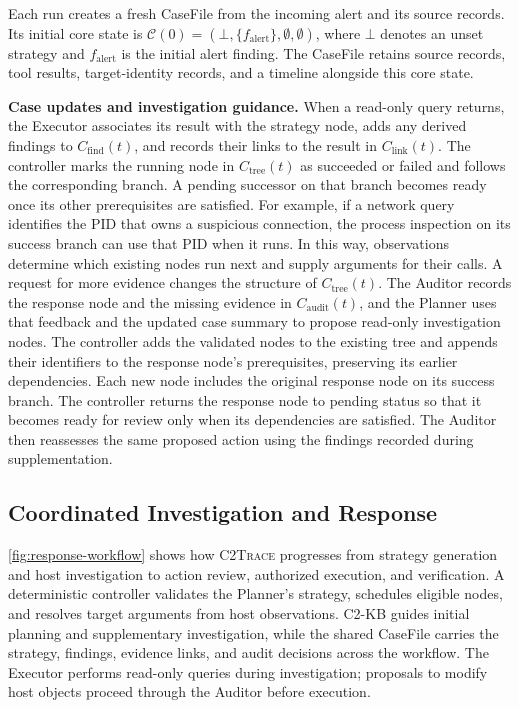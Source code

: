 \documentclass[pdflatex,sn-basic]{sn-jnl}
\newcommand{\system}{\textsc{C2Trace}\xspace}
\begin{document}
Each run creates a fresh CaseFile from the incoming alert and its source records. Its initial core state is $\mathcal{C}(0)=(\bot,\{f_{\mathrm{alert}}\},\emptyset,\emptyset)$, where $\bot$ denotes an unset strategy and $f_{\mathrm{alert}}$ is the initial alert finding. The CaseFile retains source records, tool results, target-identity records, and a timeline alongside this core state.

\noindent\textbf{Case updates and investigation guidance.} When a read-only query returns, the Executor associates its result with the strategy node, adds any derived findings to $C_{\mathrm{find}}(t)$, and records their links to the result in $C_{\mathrm{link}}(t)$. The controller marks the running node in $C_{\mathrm{tree}}(t)$ as succeeded or failed and follows the corresponding branch. A pending successor on that branch becomes ready once its other prerequisites are satisfied. For example, if a network query identifies the PID that owns a suspicious connection, the process inspection on its success branch can use that PID when it runs. In this way, observations determine which existing nodes run next and supply arguments for their calls. A request for more evidence changes the structure of $C_{\mathrm{tree}}(t)$. The Auditor records the response node and the missing evidence in $C_{\mathrm{audit}}(t)$, and the Planner uses that feedback and the updated case summary to propose read-only investigation nodes. The controller adds the validated nodes to the existing tree and appends their identifiers to the response node's prerequisites, preserving its earlier dependencies. Each new node includes the original response node on its success branch. The controller returns the response node to pending status so that it becomes ready for review only when its dependencies are satisfied. The Auditor then reassesses the same proposed action using the findings recorded during supplementation.

\subsection{Coordinated Investigation and Response}
\label{sec:coordinated-workflow}

\autoref{fig:response-workflow} shows how \system progresses from strategy generation and host investigation to action review, authorized execution, and verification. A deterministic controller validates the Planner's strategy, schedules eligible nodes, and resolves target arguments from host observations. C2-KB guides initial planning and supplementary investigation, while the shared CaseFile carries the strategy, findings, evidence links, and audit decisions across the workflow. The Executor performs read-only queries during investigation; proposals to modify host objects proceed through the Auditor before execution.
\end{document}
